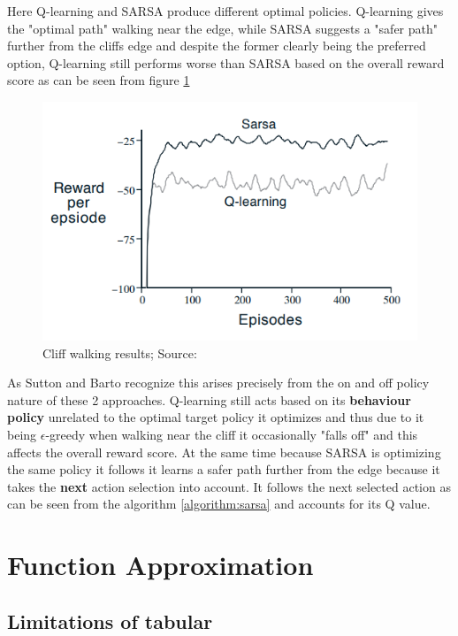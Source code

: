 Here Q-learning and SARSA produce different optimal policies. Q-learning gives the "optimal path" walking near the edge, while SARSA suggests a "safer path" further
from the cliffs edge and despite the former clearly 
being the preferred option, Q-learning still performs 
worse than SARSA based on the overall reward score as can be seen from figure \ref{fig:cliff_score}

\begin{figure}[H]
\centering
\includegraphics[scale=0.6]{figures/cliff_score.PNG}
  \caption{Cliff walking results; Source: \cite{sutton_barto}}
  \label{fig:cliff_score}
\end{figure}

As Sutton and Barto recognize \cite{sutton_barto} this 
arises precisely from the on and off policy nature of 
these 2 approaches. Q-learning still acts based on its
\textbf{behaviour policy} unrelated to the optimal target policy it optimizes and thus due to it being $\epsilon$-greedy when walking near the cliff it occasionally "falls off" and this affects the overall
reward score.  At the same time because SARSA is 
optimizing the same policy it follows it learns a safer
path further from the edge because it takes the \textbf{next} action selection into account. 
It follows the next selected action as can be seen from the 
algorithm \ref{algorithm:sarsa} and accounts for its Q value.

\section{Function Approximation}

\subsection{Limitations of tabular}

